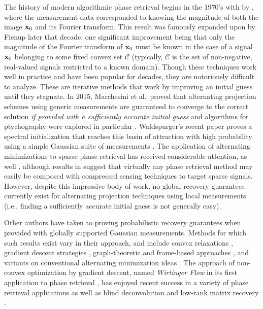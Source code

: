 The history of modern algorithmic phase retrieval begins in the 1970's with \cite{gerchberg1972practical} by \citeauthor*{gerchberg1972practical}, where the measurement data corresponded to knowing the magnitude of both the image $\mathbf x_0$ and its Fourier transform.  This result was famously expanded upon by Fienup \cite{fienup1978reconstruction} later that decade, one significant improvement being that only the magnitude of the Fourier transform of $\mathbf x_0$ must be known in the case of a signal $\mathbf x_0$ belonging to some fixed convex set $\mathcal{C}$ (typically, $\mathcal{C}$ is the set of non-negative, real-valued signals restricted to a known domain).  Though these techniques work well in practice and have been popular for decades, they are notoriously difficult to analyze.  These are iterative methods that work by improving an initial guess until they stagnate.  In 2015, Marchesini et al.~proved that alternating projection schemes using generic measurements are guaranteed to converge to the correct solution {\em if provided with a sufficiently accurate initial guess} and algorithms for ptychography were explored in particular \cite{marchesini2015alternating}.  Waldspurger's recent paper proves a spectral initialization that reaches this basin of attraction with high probability using a simple Gaussian suite of measurements \cite{waldspurger2018gerchsax}.  The application of alternating minimizations to sparse phase retrieval has received considerable attention, as well \cite{jagatap2017fast,eldar2017fienup}, although results in \cite{IVW2017_easy} suggest that virtually any phase retrieval method may easily be composed with compressed sensing techniques to target sparse signals.  However, despite this impressive body of work, no global recovery guarantees currently exist for alternating projection techniques using local measurements (i.e., finding a sufficiently accurate initial guess is not generally easy).

Other authors have taken to proving probabilistic recovery guarantees when provided with globally supported Gaussian measurements.  Methods for which such results exist vary in their approach, and include convex relaxations \cite{candes2014solving,candes2012phaselift,hassibi2018phasemax,waldspurger2015phasecut}, gradient descent strategies \cite{candes2015wtf,gangwang2017quadratic}, graph-theoretic \cite{alexeev2014phase,salanevich2015polarization} and frame-based approaches \cite{balan2009painless, bodmann2013stable,bodmann2017frames}, and variants on conventional alternating minimization ideas \cite{netrapalli2013phase,waldspurger2018gerchsax}.  The approach of non-convex optimization by gradient descent, named \emph{Wirtinger Flow} in its first application to phase retrieval \cite{candes2015wtf}, has enjoyed recent success in a variety of phase retrieval applications \cite{soltanolkotabi2018multiplexed,soltanolkotabi2018accelwtf} as well as blind deconvolution \cite{strohmer2017wtf_deconv1,strohmer2017wtf_deconv2} and low-rank matrix recovery \cite{soltanolkotabi2016procrustes}.

